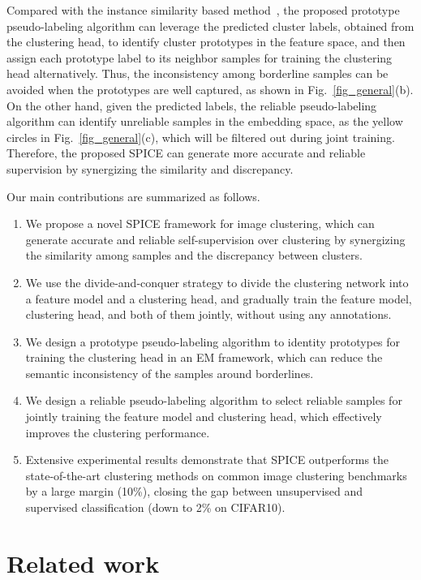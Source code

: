 \documentclass[journal]{IEEEtran}
\begin{document}
Compared with the instance similarity based method~\cite{scan}, the proposed prototype pseudo-labeling algorithm can leverage the predicted cluster labels, obtained from the clustering head, to identify cluster prototypes in the feature space, and then assign each prototype label to its neighbor samples for training the clustering head alternatively. Thus, the inconsistency among borderline samples can be avoided when the prototypes are well captured, as shown in Fig.~\ref{fig_general}(b).
On the other hand, given the predicted labels, the reliable pseudo-labeling algorithm can identify unreliable samples in the embedding space, as the yellow circles in Fig.~\ref{fig_general}(c), which will be filtered out during joint training. Therefore, the proposed SPICE can generate more accurate and reliable supervision by synergizing the similarity and discrepancy.







Our main contributions are summarized as follows.
\begin{enumerate}
\item  We propose a novel SPICE framework for image clustering, which can generate accurate and reliable self-supervision over clustering by synergizing the similarity among samples and the discrepancy between clusters.
\item We use the divide-and-conquer strategy to divide the clustering network into a feature model and a clustering head, and gradually train the feature model, clustering head, and both of them jointly, without using any annotations.
\item  We design a prototype pseudo-labeling algorithm to identity prototypes for training the clustering head in an EM framework, which can reduce the semantic inconsistency of the samples around borderlines.
\item  We design a reliable pseudo-labeling algorithm to select reliable samples for jointly training the feature model and clustering head, which effectively improves the clustering performance.
\item  Extensive experimental results demonstrate that SPICE outperforms the state-of-the-art clustering methods on common image clustering benchmarks by a large margin (10\%), closing the gap between unsupervised and supervised classification (down to 2\% on CIFAR10).
\end{enumerate}


\section{Related work}
\end{document}
